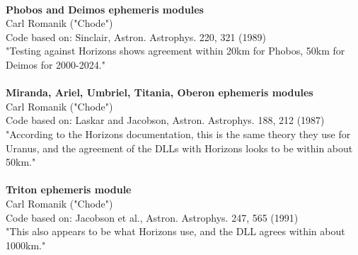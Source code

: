 \documentclass[Orbiter User Manual.tex]{subfiles}
\begin{document}
\\
\textbf{Phobos and Deimos ephemeris modules}\\
Carl Romanik ("Chode")\\
Code based on: Sinclair, Astron. Astrophys. 220, 321 (1989)\\
"Testing against Horizons shows agreement within 20km for Phobos, 50km for Deimos for 2000-2024."\\
\\
\textbf{Miranda, Ariel, Umbriel, Titania, Oberon ephemeris modules}\\
Carl Romanik ("Chode")\\
Code based on: Laskar and Jacobson, Astron. Astrophys. 188, 212 (1987)\\
"According to the Horizons documentation, this is the same theory they use for Uranus, and the agreement of the DLLs with Horizons looks to be within about 50km."\\
\\
\textbf{Triton ephemeris module}\\
Carl Romanik ("Chode")\\
Code based on: Jacobson et al., Astron. Astrophys. 247, 565 (1991)\\
"This also appears to be what Horizons use, and the DLL agrees within about 1000km."
\\
\end{document}
